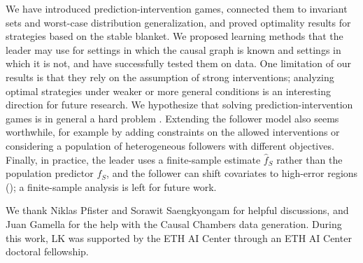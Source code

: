 We have introduced prediction-intervention games, connected them to
invariant sets and worst-case distribution generalization, and proved
optimality results for strategies based on the stable blanket. We proposed learning methods that the leader may use for settings in which the causal graph is known and settings in which it is not, and have successfully tested them on data.
One limitation of our results is that they
rely on the assumption of strong interventions;
analyzing optimal strategies under weaker or
more general conditions is an interesting direction for future research.
We hypothesize that solving prediction-intervention games is in
general a hard problem \citep[e.g.,][]{ConitzerS06}.
Extending the follower model also seems worthwhile, for example by
adding constraints on the allowed interventions or
considering a population of heterogeneous followers with different
objectives.
Finally, in practice, the leader uses a finite-sample estimate $\hat f_S$ rather than
the population predictor $f_S$, and the follower can shift covariates to high-error regions
(); a finite-sample analysis is left for future work.





\begin{ack}
We thank Niklas Pfister and Sorawit Saengkyongam for helpful discussions, and Juan Gamella for the help with the Causal Chambers data generation. During this work, LK was
supported by the ETH AI Center through an ETH AI Center doctoral fellowship. 
\end{ack}



\vskip 0.2in



\appendix
\clearpage


\listofappendices
\vskip 0.75in


